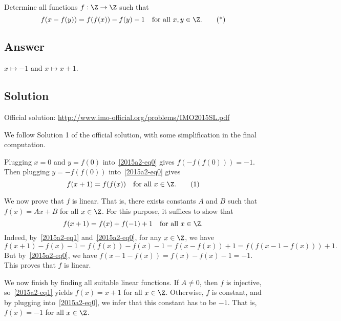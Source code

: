 Determine all functions $f : \Z \to \Z$ such that
\[ f(x - f(y)) = f(f(x)) - f(y) - 1 \quad \text{for all } x, y \in \Z. \tag{*}\label{2015a2-eq0} \]



\subsection*{Answer}

$x \mapsto -1$ and $x \mapsto x + 1$.



\subsection*{Solution}

Official solution: \url{http://www.imo-official.org/problems/IMO2015SL.pdf}

We follow Solution 1 of the official solution, with some simplification in the final computation.

Plugging $x = 0$ and $y = f(0)$ into~\eqref{2015a2-eq0} gives $f(-f(f(0))) = -1$.
Then plugging $y = -f(f(0))$ into~\eqref{2015a2-eq0} gives
\[ f(x + 1) = f(f(x)) \quad \text{for all } x \in \Z. \tag{1}\label{2015a2-eq1} \]

We now prove that $f$ is linear.
That is, there exists constants $A$ and $B$ such that $f(x) = Ax + B$ for all $x \in \Z$.
For this purpose, it suffices to show that
\[ f(x + 1) = f(x) + f(-1) + 1 \quad \text{for all } x \in \Z. \]
Indeed, by~\eqref{2015a2-eq1} and~\eqref{2015a2-eq0}, for any $x \in \Z$, we have
\[ f(x + 1) - f(x) - 1 = f(f(x)) - f(x) - 1 = f(x - f(x)) + 1 = f(f(x - 1 - f(x))) + 1. \]
But by~\eqref{2015a2-eq0}, we have $f(x - 1 - f(x)) = f(x) - f(x) - 1 = -1$.
This proves that $f$ is linear.

We now finish by finding all suitable linear functions.
If $A \neq 0$, then $f$ is injective, so~\eqref{2015a2-eq1} yields $f(x) = x + 1$ for all $x \in \Z$.
Otherwise, $f$ is constant, and by plugging into~\eqref{2015a2-eq0}, we infer that this constant has to be $-1$.
That is, $f(x) = -1$ for all $x \in \Z$.
